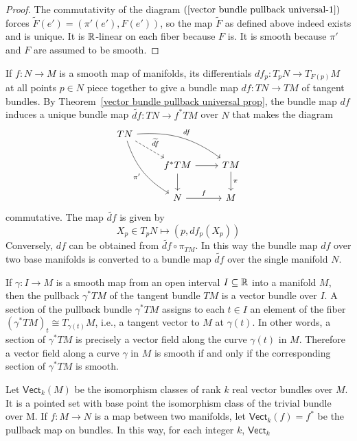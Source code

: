 \begin{proof}
The commutativity of the diagram $(\ref{vector bundle pullback universal-1})$ forces $\widetilde{F}(e')=(\pi'(e'),F(e'))$, so the map $\widetilde{F}$ as defined above 
indeed exists and is unique. It is $\mathbb{R}$-linear on each fiber because $F$ is. It is smooth because $\pi'$ and $F$ are assumed to be smooth.
\end{proof}
\begin{example}
If $f:N\to M$ is a smooth map of manifolds, its differentials $df_p:T_pN\to T_{F(p)}M$ at all points $p\in N$ piece together to give a bundle map $df:TN\to TM$ of 
tangent bundles. By Theorem~\ref{vector bundle pullback universal prop}, the bundle map $df$ induces a unique bundle map $\widetilde{df}:TN\to f^*TM$ over $N$ that 
makes the diagram
\[\begin{tikzcd}
TN\ar[rrd,bend left=20pt,"df"]\ar[rdd,bend right=20pt,swap,"\pi'"]\ar[rd,dashed,"\widetilde{df}"]&&\\
&f^*TM\ar[d]\ar[r]&TM\ar[d,"\pi"]\\
&N\ar[r,"f"]&M
\end{tikzcd}\]
commutative. The map $\widetilde{df}$ is given by
\[X_p\in T_pN\mapsto(p,df_p(X_p))\]
Conversely, $df$ can be obtained from $\widetilde{df}\circ\pi_{TM}$. In this way the bundle map $df$ over two base manifolds is converted to a bundle map $\widetilde{df}$ 
over the single manifold $N$.
\end{example}
\begin{example}
If $\gamma:I\to M$ is a smooth map from an open interval $I\subseteq\mathbb{R}$ into a manifold $M$, then the pullback $\gamma^*TM$ of the tangent bundle $TM$ is a vector bundle 
over $I$. A section of the pullback bundle $\gamma^*TM$ assigns to each $t\in I$ an element of the fiber $(\gamma^*TM)_t\cong T_{\gamma(t)}M$, i.e., a tangent vector 
to $M$ at $\gamma(t)$. In other words, a section of $\gamma^*TM$ is precisely a vector field along the curve $\gamma(t)$ in $M$. Therefore a vector field along a curve 
$\gamma$ in $M$ is smooth if and only if the corresponding section of $\gamma^*TM$ is smooth.
\end{example}
Let $\mathsf{Vect}_k(M)$ be the isomorphism classes of rank $k$ real vector bundles over $M$. It is a pointed set with base point the isomorphism class of the trivial 
bundle over M. If $f:M\to N$ is a map between two manifolds, let $\mathsf{Vect}_k(f)=f^*$ be the pullback map on bundles. In this way, for each integer $k$, $\mathsf{Vect}_k$ 
